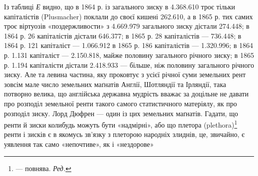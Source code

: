 Із таблиці \emph{Е} видно, що в 1864 р. із загального зиску в 4.368.610 троє тільки капіталістів (Plusmacher) поклали до
своєї кишені 262.610, а в 1865 р. тих самих троє
віртуозів «поздержливости» з 4.669.979 загального
зиску дістали 274.448; в 1864 р. 26 капіталістів
дістали 646.377; в 1865 р. 28 капіталістів —
736.448; в 1864 р. 121 капіталіст — 1.066.912 в 1865 р. 186 капіталістів — 1.320.996; в 1864 р. 1.131 капіталіст — 2.150.818,
майже половину загального річного зиску; в 1865 р.
1.194 капіталісти дістали 2.418.933 — більше, ніж
половину загального річного зиску. Але та левина частина,
яку проковтує з усієї річної суми земельних рент зовсім мале
число земельних маґнатів Англії, Шотляндії та Ірляндії, така
потворно велика, що англійська державна мудрість вважає за
доцільне не давати про розподіл земельної ренти такого самого
статистичного матеріялу, як про розподіл зиску. Лорд Дюфрен
— один із цих земельних маґнатів. Гадати, що ренти й зиски
колибудь можуть бути «надмірні», або що плетора (plethora)\footnote*{
— повнява. \emph{Ред.}
}
ренти і зисків є в якомусь зв’язку з плеторою народніх злиднів,
це, звичайно, є уявлення так само «непочтиве», як і «нездорове»
\parbreak{}  %
